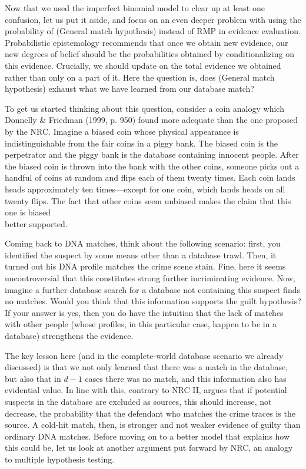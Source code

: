 \documentclass[10pt,dvipsnames,enabledeprecatedfontcommands]{scrartcl}
\begin{document}
Now that we used the imperfect binomial model to clear up at least one
confusion, let us put it aside, and focus on an even deeper problem with
using the probability of (General match hypothesis) instead of RMP in
evidence evaluation. Probabilistic epistemology recommends that once we
obtain new evidence, our new degrees of belief should be the
probabilities obtained by conditionalizing on this evidence. Crucially,
we should update on the total evidence we obtained rather than only on a
part of it. Here the question is, does (General match hypothesis)
exhaust what we have learned from our database match?

To get us started thinking about this question, consider a coin analogy
which Donnelly \& Friedman (1999, p. 950) found more adequate than the
one proposed by the NRC. Imagine a biased coin whose physical appearance
is indistinguishable from the fair coins in a piggy bank. The biased
coin is the perpetrator and the piggy bank is the database containing
innocent people. After the biased coin is thrown into the bank with the
other coins, someone picks out a handful of coins at random and flips
each of them twenty times. Each coin lands heads approximately ten
times---except for one coin, which lands heads on all twenty flips. The
fact that other coins seem unbiased makes the claim that this one is
biased\\
better supported.

Coming back to DNA matches, think about the following scenario: first,
you identified the suspect by some means other than a database trawl.
Then, it turned out his DNA profile matches the crime scene stain. Fine,
here it seems uncontroversial that this constitutes strong further
incriminating evidence. Now, imagine a further database search for a
database not containing this suspect finds no matches. Would you think
that this information supports the guilt hypothesis? If your answer is
yes, then you do have the intuition that the lack of matches with other
people (whose profiles, in this particular case, happen to be in a
database) strengthens the evidence.

The key lesson here (and in the complete-world database scenario we
already discussed) is that we not only learned that there was a match in
the database, but also that in \(d-1\) cases there was no match, and
this information also has evidential value. In line with this, contrary
to NRC II, \cite{donnelly1999DNADatabaseSearches} argues that if
potential suspects in the database are excluded as sources, this should
increase, not decrease, the probability that the defendant who matches
the crime traces is the source. A cold-hit match, then, is stronger and
not weaker evidence of guilty than ordinary DNA matches. Before moving
on to a better model that explains how this could be, let us look at
another argument put forward by NRC, an analogy to multiple hypothesis
testing.
\end{document}
